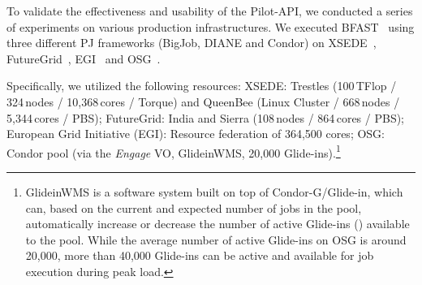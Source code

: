 \documentclass[conference]{IEEEtran}
\begin{document}
To validate the effectiveness and usability of the Pilot-API, we
conducted a series of experiments on various production infrastructures. We
executed BFAST~\cite{bfast2009} using three different PJ frameworks (BigJob,
DIANE and Condor) on XSEDE~\cite{xsede}, FutureGrid~\cite{fg}, EGI~\cite{egi}
and OSG~\cite{1742-6596-78-1-012057}.

Specifically, we utilized the following resources: XSEDE: Trestles 
(100\,TFlop / 324\,nodes / 10,368\,cores / Torque) and QueenBee
(Linux Cluster / 668\,nodes / 5,344\,cores / PBS); FutureGrid:
India and Sierra (108\,nodes / 864\,cores / PBS); 
European Grid Initiative (EGI): Resource federation of 364,500 cores;
OSG: Condor pool (via the \textit{Engage} VO, GlideinWMS,
20,000 Glide-ins).\footnote{GlideinWMS is a software system built on
top of Condor-G/Glide-in, which can, based on the current and expected
number of jobs in the pool,  automatically increase or decrease the
number of active Glide-ins (\pilots) available to the pool.  While the
average number of active Glide-ins on OSG is around 20,000, more than
40,000 Glide-ins can be active and available for job execution during
peak load.}

 


\end{document}
